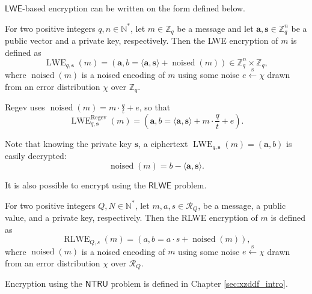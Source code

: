 $\mathsf{LWE}$-based encryption can be written on the form defined below.
\begin{definition}\label{def:lwe_encr}
For two positive integers $q,n \in \mathbb{N}^*$, let \linebreak $m \in \mathbb{Z}_q$ be a message and let $\mathbf{a}, \mathbf{s} \in \mathbb{Z}_q^n$ be a public vector and a private key, respectively. Then the LWE encryption of $m$ is defined as
$$\operatorname{LWE}_{q,\mathbf{s}}(m) = (\mathbf{a}, b = \langle \mathbf{a}, \mathbf{s} \rangle + \operatorname{noised}(m)) \in \mathbb{Z}_q^n \times \mathbb{Z}_q,$$
where $\operatorname{noised}(m)$ is a noised encoding of $m$ using some noise $e \xleftarrow{\text{s}} \chi$ drawn from an error distribution $\chi$ over $\mathbb{Z}_q$. %
\end{definition}

Regev \cite{cite:lwe_first} uses $\operatorname{noised}(m) = m \cdot \frac{q}{t} + e$, so that
\begin{equation}\label{eq:regev_lwe}
    \operatorname{LWE}_{q,\mathbf{s}}^{\text{Regev}}(m) = \left(\mathbf{a}, b = \langle \mathbf{a}, \mathbf{s} \rangle + m \cdot \frac{q}{t} + e\right).
\end{equation}

Note that knowing the private key $\mathbf{s}$, a ciphertext $\operatorname{LWE}_{q,\mathbf{s}}(m) = (\mathbf{a}, b)$ is easily decrypted:
$$ \operatorname{noised}(m) = b - \langle \mathbf{a}, \mathbf{s} \rangle.$$

It is also possible to encrypt using the $\mathsf{RLWE}$ problem.

\begin{definition}\label{def:rlwe_encr}
For two positive integers $Q, N \in \mathbb{N}^*$, let $m, a, s \in \mathcal{R}_Q$, be a message, a public value, and a private key, respectively. Then the RLWE encryption of $m$ is defined as
$$\operatorname{RLWE}_{Q,s}(m) = (a, b = a \cdot s + \operatorname{noised}(m)),$$
where $\operatorname{noised}(m)$ is a noised encoding of $m$ using some noise $e \xleftarrow{\text{s}} \chi$ drawn from an error distribution $\chi$ over $\mathcal{R}_Q$.
\end{definition}

Encryption using the $\mathsf{NTRU}$ problem is defined in Chapter \ref{sec:xzddf_intro}.